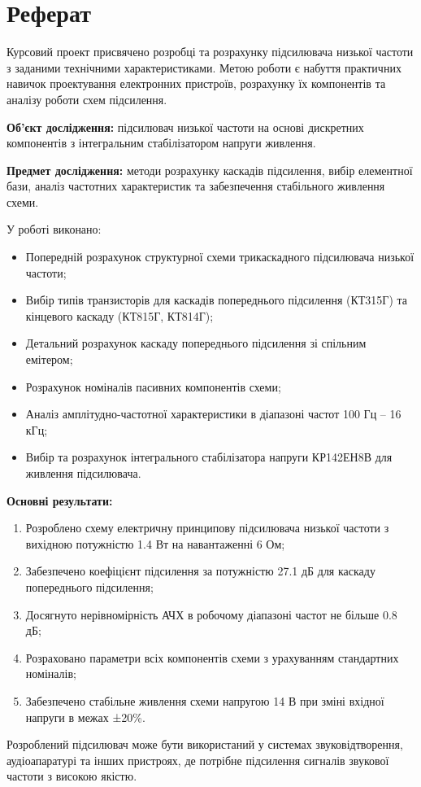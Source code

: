 \documentclass[main.tex]{subfiles}
\begin{document}
\section{Реферат}

Курсовий проект присвячено розробці та розрахунку підсилювача низької частоти з заданими технічними характеристиками. Метою роботи є набуття практичних навичок проектування електронних пристроїв, розрахунку їх компонентів та аналізу роботи схем підсилення.

\textbf{Об'єкт дослідження:} підсилювач низької частоти на основі дискретних компонентів з інтегральним стабілізатором напруги живлення.

\textbf{Предмет дослідження:} методи розрахунку каскадів підсилення, вибір елементної бази, аналіз частотних характеристик та забезпечення стабільного живлення схеми.

У роботі виконано:
\begin{itemize}
    \item Попередній розрахунок структурної схеми трикаскадного підсилювача низької частоти;
    \item Вибір типів транзисторів для каскадів попереднього підсилення (КТ315Г) та кінцевого каскаду (КТ815Г, КТ814Г);
    \item Детальний розрахунок каскаду попереднього підсилення зі спільним емітером;
    \item Розрахунок номіналів пасивних компонентів схеми;
    \item Аналіз амплітудно-частотної характеристики в діапазоні частот 100 Гц -- 16 кГц;
    \item Вибір та розрахунок інтегрального стабілізатора напруги КР142ЕН8В для живлення підсилювача.
\end{itemize}

\textbf{Основні результати:}
\begin{enumerate}
    \item Розроблено схему електричну принципову підсилювача низької частоти з вихідною потужністю 1.4 Вт на навантаженні 6 Ом;
    \item Забезпечено коефіцієнт підсилення за потужністю 27.1 дБ для каскаду попереднього підсилення;
    \item Досягнуто нерівномірність АЧХ в робочому діапазоні частот не більше 0.8 дБ;
    \item Розраховано параметри всіх компонентів схеми з урахуванням стандартних номіналів;
    \item Забезпечено стабільне живлення схеми напругою 14 В при зміні вхідної напруги в межах ±20\%.
\end{enumerate}

Розроблений підсилювач може бути використаний у системах звуковідтворення, аудіоапаратурі та інших пристроях, де потрібне підсилення сигналів звукової частоти з високою якістю.
\end{document}
